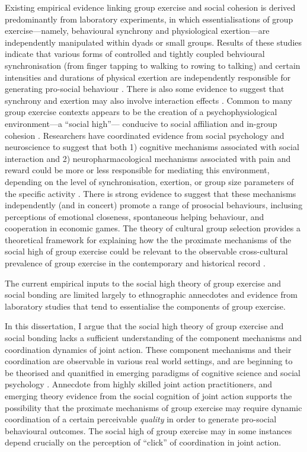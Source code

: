 Existing empirical evidence linking group exercise and social cohesion is derived predominantly from laboratory experiments, in which essentialisations of group exercise---namely, behavioural synchrony and physiological exertion---are independently manipulated within dyads or small groups.  Results of these studies indicate that various forms of controlled and tightly coupled  behvioural synchronisation (from finger tapping to walking to rowing to talking) and certain intensities and durations of physical exertion are independently responsible for generating pro-social behaviour \citep{Tarr2015}.  There is also some evidence to suggest that synchrony and exertion may also involve interaction effects \citep{Lewis2018}.  Common to many group exercise contexts appears to be the creation of a psychophysiological environment---a ``social high''--- conducive to social affiliation and in-group cohesion \citep{Davis2015}. Researchers have coordinated evidence from social psychology and neuroscience to suggest that both 1) cognitive mechanisms associated with social interaction and 2) neuropharmacological mechanisms associated with pain and reward could be more or less responsible for mediating this environment, depending on the level of synchronisation, exertion, or group size parameters of the specific activity \citep{Mogan2017}. There is strong evidence to suggest that these mechanisms independently (and in concert) promote a range of prosocial behaviours, inclusing perceptions of emotional closeness, spontaneous helping behaviour, and cooperation in economic games. The theory of cultural group selection provides a theoretical framework for explaining how the the proximate mechanisms of the social high of group exercise could be relevant to the observable cross-cultural prevalence of group exercise in the contemporary and historical record \citep{Dunbar2010,Whitehouse2014a}.

The current empirical inputs to the social high theory of group exercise and social bonding are limited largely to ethnographic annecdotes and evidence from laboratory studies that tend to essentialise the components of group exercise.

In this dissertation, I argue that the social high theory of group exercise and social bonding lacks a sufficient understanding of the component mechanisms and coordination dynamics of joint action.  These component mechanisms and their coordination are observable in various real world settings, and are beginning to be theorised and quanitfied in emerging paradigms of cognitive science and social psychology \citep{Marsh2009}.  Annecdote from highly skilled joint action practitioners, and emerging theory evidence from the social cognition of joint action supports the possibility that the proximate mechanisms of group exercise may require dynamic coordination of a certain perceivable \textit{quality} in order to generate pro-social behavioural outcomes.  The social high of group exercise may in some instances depend crucially on the perception of ``click'' of coordination in joint action.

